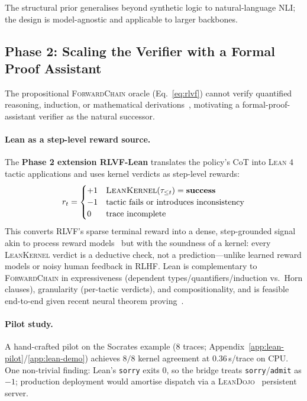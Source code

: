 \documentclass{article}
\begin{document}
The structural prior generalises beyond synthetic logic to natural-language NLI; the design is model-agnostic and applicable to larger backbones.

\subsection{Phase 2: Scaling the Verifier with a Formal Proof Assistant}
\label{sec:phase2}

The propositional \textsc{ForwardChain} oracle (Eq.~\ref{eq:rlvf}) cannot verify quantified reasoning, induction, or mathematical derivations~\citep{davis2024benchmarks,davis2024mathematics,davis2024gpt4o1}, motivating a formal-proof-assistant verifier as the natural successor.

\paragraph{Lean as a step-level reward source.}
The \textbf{Phase 2 extension RLVF-Lean} translates the policy's CoT into \textsc{Lean 4}~\citep{moura2021lean4} tactic applications and uses kernel verdicts as step-level rewards:
\begin{equation}
r_t = \begin{cases} +1 & \textsc{LeanKernel}(\tau_{\leq t}) = \mathbf{success} \\ -1 & \text{tactic fails or introduces inconsistency} \\ 0 & \text{trace incomplete} \end{cases}
\label{eq:lean-reward}
\end{equation}
This converts RLVF's sparse terminal reward into a dense, step-grounded signal akin to process reward models~\citep{lightman2024prm} but with the soundness of a kernel: every \textsc{LeanKernel} verdict is a deductive check, not a prediction---unlike learned reward models or noisy human feedback in RLHF. Lean is complementary to \textsc{ForwardChain} in expressiveness (dependent types/quantifiers/induction vs.\ Horn clauses), granularity (per-tactic verdicts), and compositionality, and is feasible end-to-end given recent neural theorem proving~\citep{yang2023leandojo,polu2020gpt-f,alphaproof2024}.

\paragraph{Pilot study.}
A hand-crafted pilot on the Socrates example (8 traces; Appendix~\ref{app:lean-pilot}/\ref{app:lean-demo}) achieves $8/8$ kernel agreement at $0.36$\,s/trace on CPU. One non-trivial finding: Lean's \texttt{sorry} exits 0, so the bridge treats \texttt{sorry}/\texttt{admit} as $-1$; production deployment would amortise dispatch via a \textsc{LeanDojo}~\citep{yang2023leandojo} persistent server.
\end{document}
